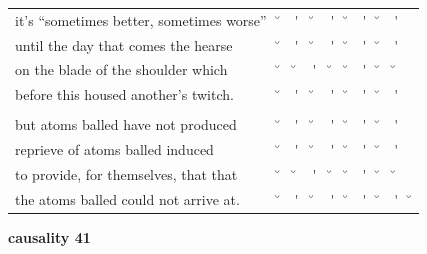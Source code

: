 \documentclass[12pt, landscape]{article}
\begin{document}
\begin{center}
\begin{tabularx}{\textwidth}{
>{\lefting\arraybackslash}X
c
c
c
c
c
c
c
c
c
}

it's ``sometimes better, sometimes worse'' & \u{} & \'{} & \u{} & \'{} & \u{} & \'{} & \u{} & \'{} & \\
until the day that comes the hearse & \u{} & \'{} & \u{} & \'{} & \u{} & \'{} & \u{} & \'{} & \\
on the blade of the shoulder which & \u{} & \u{} & \'{} & \u{} & \u{} & \'{} & \u{} & \u{} & \\
before this housed another's twitch. & \u{} & \'{} & \u{} & \'{} & \u{} & \'{} & \u{} & \'{} & \\
 & & & & & & & & \\
but atoms balled have not produced  & \u{} & \'{} & \u{} & \'{} & \u{} & \'{} & \u{} & \'{} & \\
reprieve of atoms balled induced & \u{} & \'{} & \u{} & \'{} & \u{} & \'{} & \u{} & \'{} & \\
to provide, for themselves, that that & \u{} & \u{} & \'{} & \u{} & \u{} & \'{} & \u{} & \u{} & \\
the atoms balled could not arrive at. & \u{} & \'{} & \u{} & \'{} & \u{} & \'{} & \u{} & \'{} & \u{} \\
\end{tabularx}
\end{center}

\vspace*{\fill}

\newpage

\vspace*{\fill}

\noindent \textbf{causality 41}
\noindent \hfill \par
\end{document}
